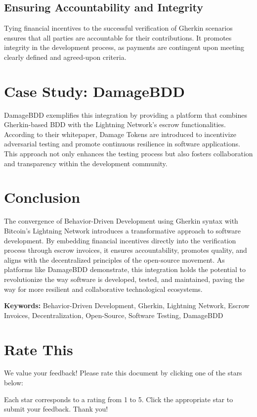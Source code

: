 \documentclass[12pt]{article}
\begin{document}
\subsection*{Ensuring Accountability and Integrity}
Tying financial incentives to the successful verification of Gherkin scenarios ensures that all parties are accountable for their contributions. It promotes integrity in the development process, as payments are contingent upon meeting clearly defined and agreed-upon criteria.

\section*{Case Study: DamageBDD}
DamageBDD exemplifies this integration by providing a platform that combines Gherkin-based BDD with the Lightning Network's escrow functionalities. According to their whitepaper, Damage Tokens are introduced to incentivize adversarial testing and promote continuous resilience in software applications. This approach not only enhances the testing process but also fosters collaboration and transparency within the development community.

\section*{Conclusion}
The convergence of Behavior-Driven Development using Gherkin syntax with Bitcoin's Lightning Network introduces a transformative approach to software development. By embedding financial incentives directly into the verification process through escrow invoices, it ensures accountability, promotes quality, and aligns with the decentralized principles of the open-source movement. As platforms like DamageBDD demonstrate, this integration holds the potential to revolutionize the way software is developed, tested, and maintained, paving the way for more resilient and collaborative technological ecosystems.

\vfill
\noindent
\textbf{Keywords:} Behavior-Driven Development, Gherkin, Lightning Network, Escrow Invoices, Decentralization, Open-Source, Software Testing, DamageBDD


\section*{Rate This}

We value your feedback! Please rate this document by clicking one of the stars below:

\bigskip

\noindent
\href{https://example.com/rate-this?rating=1}{\textbf{}}%
\href{https://example.com/rate-this?rating=2}{\textbf{}}%
\href{https://example.com/rate-this?rating=3}{\textbf{}}%
\href{https://example.com/rate-this?rating=4}{\textbf{}}%
\href{https://example.com/rate-this?rating=5}{\textbf{}}

\bigskip

Each star corresponds to a rating from 1 to 5. Click the appropriate star to submit your feedback. Thank you!
\end{document}
